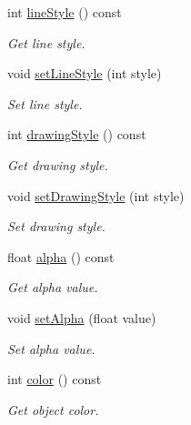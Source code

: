 \begin{DoxyCompactItemize}
int \hyperlink{class_d_d4hep_1_1_geometry_1_1_vis_attr_a2fe1437a3f88a7e0629058a5d57cc046}{lineStyle} () const 
\begin{DoxyCompactList}\small\item\em Get line style. \item\end{DoxyCompactList}\item 
void \hyperlink{class_d_d4hep_1_1_geometry_1_1_vis_attr_ad86fa3158adc9cb58bdf7d72da8f1eee}{setLineStyle} (int style)
\begin{DoxyCompactList}\small\item\em Set line style. \item\end{DoxyCompactList}\item 
int \hyperlink{class_d_d4hep_1_1_geometry_1_1_vis_attr_a91c2eb7ffa5421d48d4a6ad5ef0739cc}{drawingStyle} () const 
\begin{DoxyCompactList}\small\item\em Get drawing style. \item\end{DoxyCompactList}\item 
void \hyperlink{class_d_d4hep_1_1_geometry_1_1_vis_attr_a37d208476b8631402fe4777061abfc81}{setDrawingStyle} (int style)
\begin{DoxyCompactList}\small\item\em Set drawing style. \item\end{DoxyCompactList}\item 
float \hyperlink{class_d_d4hep_1_1_geometry_1_1_vis_attr_a65411a5cd427ffb4aa07c93c23a26937}{alpha} () const 
\begin{DoxyCompactList}\small\item\em Get alpha value. \item\end{DoxyCompactList}\item 
void \hyperlink{class_d_d4hep_1_1_geometry_1_1_vis_attr_aeca9848b297213098eac1fd882fd7680}{setAlpha} (float value)
\begin{DoxyCompactList}\small\item\em Set alpha value. \item\end{DoxyCompactList}\item 
int \hyperlink{class_d_d4hep_1_1_geometry_1_1_vis_attr_a8952252a0fd14fdbce0d28d46af92e8e}{color} () const 
\begin{DoxyCompactList}\small\item\em Get object color. \item\end{DoxyCompactList}\item 

\end{DoxyCompactItemize}
